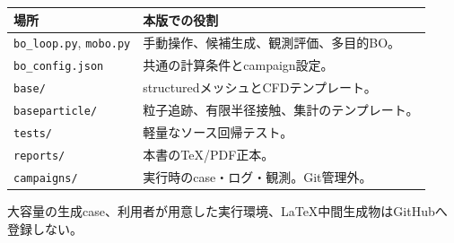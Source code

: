 \documentclass[a4paper,11pt]{article}
\newcommand{\code}[1]{\texttt{#1}}
\begin{document}
\begin{center}
\begin{tabularx}{\textwidth}{p{56mm}X}
\toprule
場所 & 本版での役割 \\
\midrule
\code{bo\_loop.py}, \code{mobo.py} & 手動操作、候補生成、観測評価、多目的BO。 \\
\code{bo\_config.json} & 共通の計算条件とcampaign設定。 \\
\code{base/} & structuredメッシュとCFDテンプレート。 \\
\code{baseparticle/} & 粒子追跡、有限半径接触、集計のテンプレート。 \\
\code{tests/} & 軽量なソース回帰テスト。 \\
\code{reports/} & 本書のTeX/PDF正本。 \\
\code{campaigns/} & 実行時のcase・ログ・観測。Git管理外。 \\
\bottomrule
\end{tabularx}
\end{center}

大容量の生成case、利用者が用意した実行環境、LaTeX中間生成物はGitHubへ登録しない。
\end{document}
